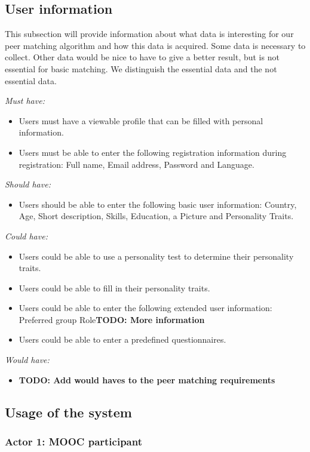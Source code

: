 \documentclass[]{article}
\newcommand{\TODO}[1]{{\color{red}\textbf{TODO: #1}}}
\newcommand{\reqr}[1]{{\noindent\emph{#1:}}}
\begin{document}
\subsection{User information}
This subsection will provide information about what data is interesting for our peer matching algorithm and how this data is acquired.
Some data is necessary to collect. 
Other data would be nice to have to give a better result, but is not essential for basic matching.
We distinguish the essential data and the not essential data.

\reqr{Must have}
\begin{itemize}
\item Users must have a viewable profile that can be filled with personal information.
\item Users must be able to enter the following registration information during registration: Full name, Email address, Password and Language.
\end{itemize}

\reqr{Should have}
\begin{itemize}
\item Users should be able to enter the following basic user information: Country, Age, Short description, Skills, Education, a Picture and Personality Traits.
\end{itemize}

\reqr{Could have}
\begin{itemize}
\item Users could be able to use a personality test to determine their personality traits.
\item Users could be able to fill in their personality traits.
\item Users could be able to enter the following extended user information: Preferred group Role\TODO{More information}
\item Users could be able to enter a predefined questionnaires.
\end{itemize}

\reqr{Would have}
\begin{itemize}
\item \TODO{Add would haves to the peer matching requirements}
\end{itemize}

\subsection{Usage of the system}

\subsubsection{Actor 1: MOOC participant}
\end{document}
